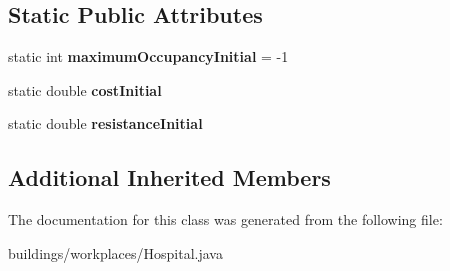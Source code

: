 \subsection*{Static Public Attributes}
\begin{DoxyCompactItemize}
\item 
static int {\bfseries maximum\+Occupancy\+Initial} = -\/1\hypertarget{classbuildings_1_1workplaces_1_1_hospital_a77ba45e6ac6ff1d848d7e9462c245466}{}\label{classbuildings_1_1workplaces_1_1_hospital_a77ba45e6ac6ff1d848d7e9462c245466}

\item 
static double {\bfseries cost\+Initial}\hypertarget{classbuildings_1_1workplaces_1_1_hospital_ab876d5830b87b1a6d18a163a4d104351}{}\label{classbuildings_1_1workplaces_1_1_hospital_ab876d5830b87b1a6d18a163a4d104351}

\item 
static double {\bfseries resistance\+Initial}\hypertarget{classbuildings_1_1workplaces_1_1_hospital_a4dcf8ca5554146ed819250eec18e124d}{}\label{classbuildings_1_1workplaces_1_1_hospital_a4dcf8ca5554146ed819250eec18e124d}

\end{DoxyCompactItemize}
\subsection*{Additional Inherited Members}


The documentation for this class was generated from the following file\+:\begin{DoxyCompactItemize}
\item 
buildings/workplaces/Hospital.\+java\end{DoxyCompactItemize}
